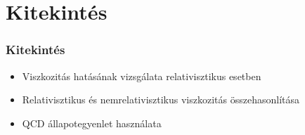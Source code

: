\documentclass{beamer}
\begin{document}
\section{Kitekintés}
\begin{frame}[noframenumbering]
\frametitle{Kitekintés}
\begin{itemize}
\setlength{\itemsep}{20pt}
\item<1-> Viszkozitás hatásának vizsgálata relativisztikus esetben
\item<1-> Relativisztikus és nemrelativisztikus viszkozitás összehasonlítása
\item<1-> QCD állapotegyenlet használata
\end{itemize}
\end{frame}
\end{document}

